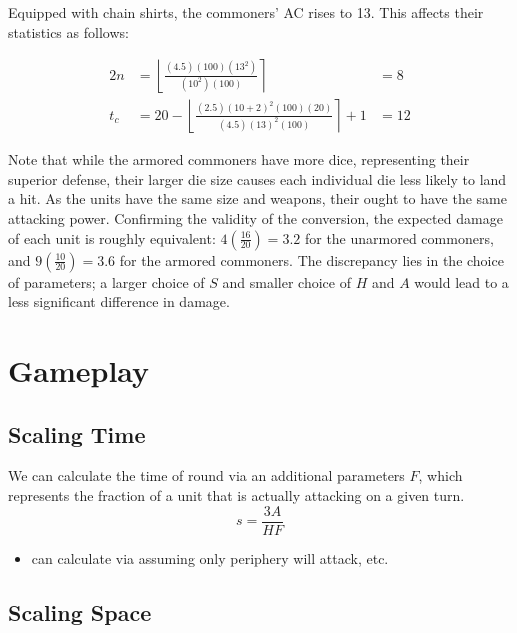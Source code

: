 \documentclass[twocolumn]{article}
\begin{document}
Equipped with chain shirts, the commoners' AC rises to 13.
This affects their statistics as follows:

\begin{alignat*}{2}
    n   &=  
        \left\lfloor
            \frac
                {(4.5) (100) (13^2)}
                {(10^2) (100)}
        \right\rceil
            &= 8
    \\
    t_c &=
        20 - 
        \left\lfloor
            \frac
                {(2.5) (10 + 2)^2 (100) (20)}
                {(4.5) (13)^2 (100)}
        \right\rceil
        + 1
            &= 12
\end{alignat*}

Note that while the armored commoners have more dice,
representing their superior defense,
their larger die size causes each individual die less likely to land a hit.
As the units have the same size and weapons,
their ought to have the same attacking power.
Confirming the validity of the conversion,
the expected damage of each unit is roughly equivalent:
$4(\frac{16}{20}) = 3.2$ for the unarmored commoners,
and $9(\frac{10}{20}) = 3.6$ for the armored commoners.
The discrepancy lies in the choice of parameters;
a larger choice of $S$ and smaller choice of $H$ and $A$
would lead to a less significant difference in damage.

\section{Gameplay}\label{sec:game}

\subsection{Scaling Time}
We can calculate the time of round via an additional parameters $F$,
which represents the fraction of a unit that is actually attacking on a given turn.
\[
    s = \frac
        {3 A}
        {H F}
\]
\begin{itemize}
    \item can calculate via assuming only periphery will attack, etc.
\end{itemize}

\subsection{Scaling Space}
\end{document}
